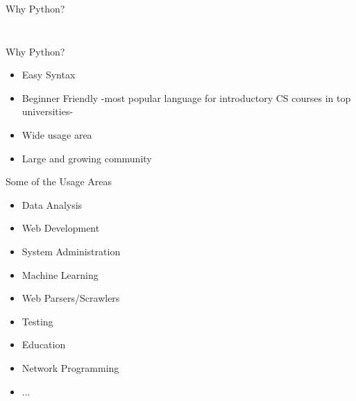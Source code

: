 	\begin{frame}{Why Python?}
		\vspace{-3mm}
		\inputminted[frame=single,framesep=2pt]{python3}{code-examples/io.py}
		\inputminted[frame=single,framesep=2pt]{java}{code-examples/io.java}
	\end{frame}

	\begin{frame}{Why Python?}
		\begin{itemize}
			\LARGE
			\item Easy Syntax
			\item Beginner Friendly
			-most popular language for introductory CS courses in top universities\cite{guo1}- 
			\item Wide usage area
			\item Large and growing community
		\end{itemize}
	\end{frame}

	\begin{frame}{Some of the Usage Areas\cite{survey_jetbrains2018}}
		\begin{itemize}
			\LARGE
			\item Data Analysis
			\item Web Development
			\item System Administration
			\item Machine Learning
			\item Web Parsers/Scrawlers
			\item Testing
			\item Education
			\item Network Programming
			\item ...
		\end{itemize}	
	\end{frame}
	
